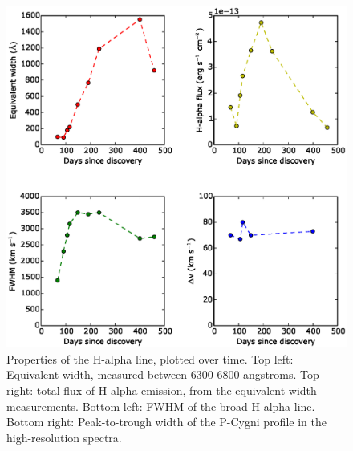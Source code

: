 \documentclass[a4paper,fleqn,usenatbib]{mnras}
\begin{document}
\begin{figure}
  \includegraphics[width=\linewidth]{graphics/H-alpha_stats.eps}
  \caption{Properties of the H-alpha line, plotted over time. Top left: Equivalent width, measured between 6300-6800 angstroms. Top right: total flux of H-alpha emission, from the equivalent width measurements. Bottom left: FWHM of the broad H-alpha line. Bottom right: Peak-to-trough width of the P-Cygni profile in the high-resolution spectra.}
  \label{fig:stats}
\end{figure}
\end{document}
